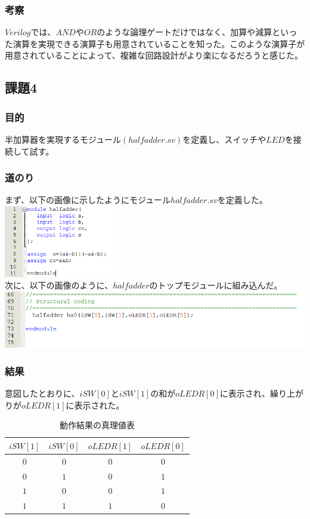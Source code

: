 \documentclass[a4paper]{jarticle}
\begin{document}
\subsubsection{考察}
$Verilog$では、$AND$や$OR$のような論理ゲートだけではなく、加算や減算といった演算を実現できる演算子も用意されていることを知った。このような演算子が用意されていることによって、複雑な回路設計がより楽になるだろうと感じた。
\subsection{課題4}
\subsubsection{目的}
半加算器を実現するモジュール$\left( halfadder.sv \right)$を定義し、スイッチや$LED$を接続して試す。
\subsubsection{道のり}
まず、以下の画像に示したようにモジュール$halfadder.sv$を定義した。\\
\includegraphics[width=5cm]{work4/4-2.PNG}\\
次に、以下の画像のように、$halfadder$のトップモジュールに組み込んだ。\\
\includegraphics[width=15cm]{work4/4-1.PNG}
\subsubsection{結果}
意図したとおりに、$iSW[0]$と$iSW[1]$の和が$oLEDR[0]$に表示され、繰り上がりが$oLEDR[1]$に表示された。
\begin{table}[!h]
	\begin{center}
		\caption{動作結果の真理値表}
		\label{Work4TruthTable}
		\begin{tabular}{|c|c||c|c|}
			\hline
			$iSW[1]$	&$iSW[0]$	&$oLEDR[1]$	&$oLEDR[0]$\\	\hline\hline
			$0$		&$0$		&$0$		&$0$\\		\hline
			$0$		&$1$		&$0$		&$1$\\		\hline
			$1$		&$0$		&$0$		&$1$\\		\hline
			$1$		&$1$		&$1$		&$0$\\		\hline
		\end{tabular}
	\end{center}
\end{table}
\end{document}
